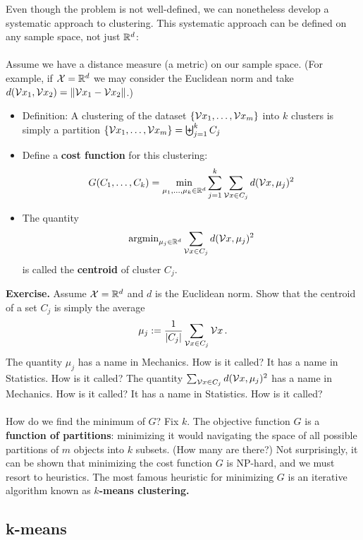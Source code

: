     Even though the problem is not well-defined, 
    we can nonetheless develop a systematic approach to clustering.
    This systematic approach can be defined on any sample space, not just
    $\mathbb{R}^d$: 
    \\\~\\
    Assume we have a distance measure (a metric) on our sample space. 
    (For example, if $\mathcal{X}=\mathbb{R}^d$ we may consider the Euclidean norm
    and take $d(\mathcal{V}{x}_1,\mathcal{V}{x}_2) = \left\| \mathcal{V}{x}_1-\mathcal{V}{x}_2\right\|$.) 
    \begin{itemize}
      \item Definition: A clustering of the dataset $\{ \mathcal{V}{x}_1,\ldots,\mathcal{V}{x}_m \}$
        into $k$ clusters is simply a 
        partition $\{ \mathcal{V}{x}_1,\ldots,\mathcal{V}{x}_m \}=\biguplus_{j=1}^k C_j$
      \item Define a {\bf cost function} for this clustering: 
       \[
         G(C_1,\ldots,C_k) = \min_{\mu_1,\ldots,\mu_k\in\mathbb{R}^d} 
         \sum_{j=1}^k
         \sum_{\mathcal{V}{x}\in C_j} d(\mathcal{V}{x},\mu_j)^2
       \]
     \item 
       The quantity 
        \[ 
          \text{argmin}_{\mu_j\in\mathbb{R}^d}  \sum_{\mathcal{V}{x}\in C_j} d(\mathcal{V}{x},\mu_j)^2
        \]
       is called the {\bf centroid} of cluster $C_j$. 

       
         \end{itemize}

   {\bf Exercise.} 
   Assume $\mathcal{X}=\mathbb{R}^d$ and $d$ is the Euclidean norm.
   Show that the centroid of a set $C_j$ is simply the average
   \[
     \mu_j := \frac{1}{|C_j|} \sum_{\mathcal{V}{x}\in C_j} \mathcal{V}{x}\,.
            \]
          The quantity $\mu_j$ 
          has a name in Mechanics. How is it called? It has a name in
          Statistics. How is it called? The quantity 
          $\sum_{\mathcal{V}{x}\in C_j} d(\mathcal{V}{x},\mu_j)^2$ has a name in Mechanics. How is
          it called? It has a name in Statistics. How is it called?
\\~\\ How do we find the minimum of $G$?
   Fix $k$. The objective function $G$ is  a {\bf function of partitions}:
   minimizing it would navigating the space of all possible partitions of $m$
   objects into $k$ subsets. (How many are there?)
   Not surprisingly, it can be shown that minimizing the cost 
   function $G$ is NP-hard, and we must resort to heuristics. 
   The most famous heuristic for minimizing $G$ is an iterative algorithm known
   as {\bf $k$-means clustering.}

\subsection{k-means}

